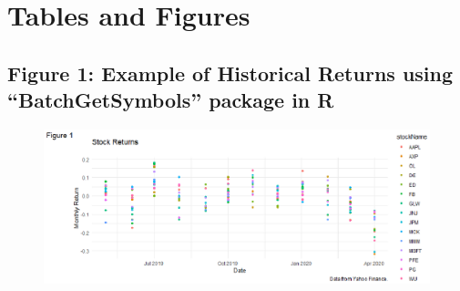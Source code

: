 \documentclass[12pt,english]{article}
\begin{document}
    
        \vfill
        \pagebreak{}
        \begin{spacing}{1.0}
        
        
        \end{spacing}
        
        \vfill
        \pagebreak{}
        \clearpage
    
    \newpage
    \section{Tables and Figures}
        \subsection{Figure 1: Example of Historical Returns using “BatchGetSymbols” package in R}
            \begin{figure}[H]
                \begin{center}
                    \includegraphics{FinalProject_Carpenter.eps}
                \end{center}
            \end{figure}
            
\end{document}
